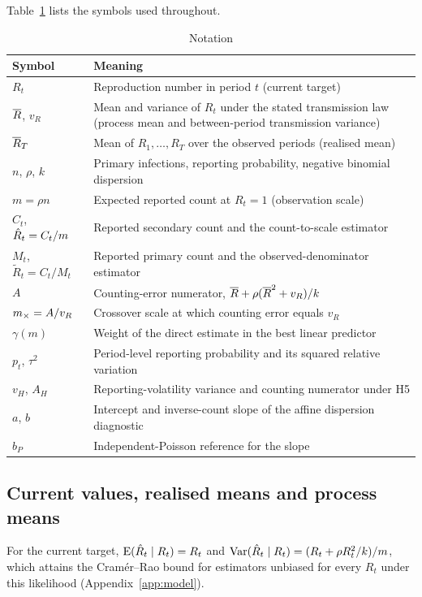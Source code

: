 Table~\ref{tab:notation} lists the symbols used throughout.

\begin{table}[!tbp]
\centering
\small
\caption{Notation}
\label{tab:notation}
\begin{tabularx}{\linewidth}{@{}lX@{}}
\toprule
Symbol & Meaning \\
\midrule
$R_t$ & Reproduction number in period $t$ (current target) \\
$\overline{R}$, $v_R$ & Mean and variance of $R_t$ under the stated transmission law (process mean and between-period transmission variance) \\
$\overline{R}_T$ & Mean of $R_1,\dots,R_T$ over the observed periods (realised mean) \\
$n$, $\rho$, $k$ & Primary infections, reporting probability, negative binomial dispersion \\
$m=\rho n$ & Expected reported count at $R_t=1$ (observation scale) \\
$C_t$, $\hat R_t=C_t/m$ & Reported secondary count and the count-to-scale estimator \\
$M_t$, $\tilde R_t=C_t/M_t$ & Reported primary count and the observed-denominator estimator \\
$A$ & Counting-error numerator, $\overline{R}+\rho(\overline{R}^2+v_R)/k$ \\
$m_\times=A/v_R$ & Crossover scale at which counting error equals $v_R$ \\
$\gamma(m)$ & Weight of the direct estimate in the best linear predictor \\
$p_t$, $\tau^2$ & Period-level reporting probability and its squared relative variation \\
$v_H$, $A_H$ & Reporting-volatility variance and counting numerator under H5 \\
$a$, $b$ & Intercept and inverse-count slope of the affine dispersion diagnostic \\
$b_P$ & Independent-Poisson reference for the slope \\
\bottomrule
\end{tabularx}
\end{table}

\subsection{Current values, realised means and process means}
\label{sec:model-targets}

For the current target, $\operatorname{E}(\hat R_t\mid R_t)=R_t$ and $\operatorname{Var}(\hat R_t\mid R_t)=(R_t+\rho R_t^2/k)/m$, which attains the Cram\'er--Rao bound for estimators unbiased for every $R_t$ under this likelihood (Appendix~\ref{app:model}).

